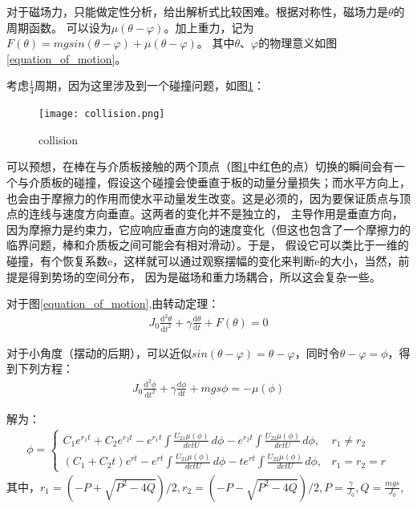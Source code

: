 \documentclass[AutoFakeBold]{LZUThesis}
\begin{document}
对于磁场力，只能做定性分析，给出解析式比较困难。根据对称性，磁场力是$\theta$的周期函数。
可以设为$\mu(\theta-\varphi)$。加上重力，记为$F(\theta) = mgsin(\theta-\varphi)+\mu(\theta-\varphi)$。
其中$\theta$、$\varphi$的物理意义如图\ref{equation_of_motion}。

考虑$\frac{1}{4}$周期，因为这里涉及到一个碰撞问题，如图\ref{collision}：
\begin{figure}[H]
    \centering
    \texttt{[image: collision.png]}
    \caption{collision}
    \label{collision}
\end{figure}
可以预想，在棒在与介质板接触的两个顶点（图\ref{collision}中红色的点）切换的瞬间会有一个与介质板的碰撞，假设这个碰撞会使垂直于板的动量分量损失；而水平方向上，
也会由于摩擦力的作用而使水平动量发生改变。这是必须的，因为要保证质点与顶点的连线与速度方向垂直。这两者的变化并不是独立的，
主导作用是垂直方向，因为摩擦力是约束力，它应响应垂直方向的速度变化（但这也包含了一个摩擦力的临界问题，棒和介质板之间可能会有相对滑动）。于是，
假设它可以类比于一维的碰撞，有个恢复系数e，这样就可以通过观察摆幅的变化来判断e的大小，当然，前提是得到势场的空间分布，
因为是磁场和重力场耦合，所以这会复杂一些。

对于图\ref{equation_of_motion},由转动定理：
\begin{equation}
    \begin{aligned}
    J_0\frac{\mathrm{d}^{2} \theta }{\mathrm{d} t^{2}} + \gamma\frac{\mathrm{d} \theta}{\mathrm{d} t} + F(\theta) = 0
    \end{aligned}
\end{equation}

对于小角度（摆动的后期），可以近似$sin(\theta - \varphi) = \theta - \varphi$，同时令$\theta - \varphi = \phi$，得到下列方程：
\begin{equation}
    \begin{aligned}
    J_0\frac{\mathrm{d}^{2} \phi }{\mathrm{d} t^{2}} + \gamma\frac{\mathrm{d} \phi}{\mathrm{d} t} + mgs\phi = -\mu(\phi)
    \end{aligned}
\end{equation}

解为：
\begin{equation}
    \begin{aligned}
    \phi = \left  \{
    \begin{array}{lr}
    C_1e^{r_1t}+C_2e^{r_2t}-e^{r_1t}\int \frac{U_{21}\mu(\phi)}{detU}\,d\phi-e^{r_2t}\int \frac{U_{22}\mu(\phi)}{detU}\,d\phi, &r_1\neq r_2 \\
    (C_1+C_2t)e^{rt}-e^{rt}\int \frac{U_{21}\mu(\phi)}{detU}\,d\phi-te^{rt}\int \frac{U_{22}\mu(\phi)}{detU}\,d\phi, &r_1 = r_2 = r
    \end{array}
    \right.
    \end{aligned}
\end{equation}
其中，$r_1 = (-P+\sqrt{P^2-4Q})/2, r_2 = (-P-\sqrt{P^2-4Q})/2, P = \frac{\gamma}{J_0}, Q = \frac{mgs}{J_0}$,
\end{document}
